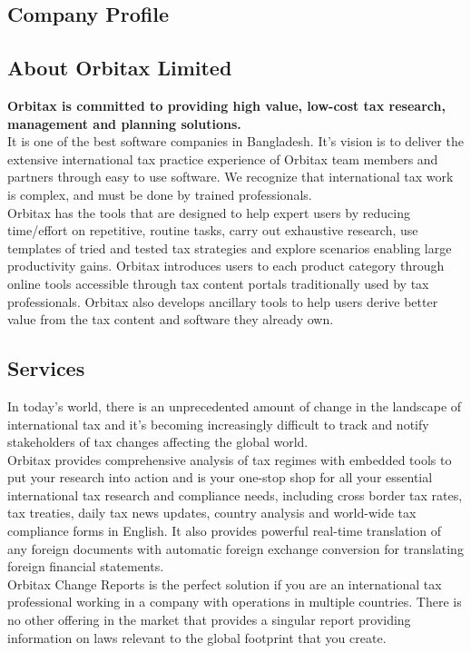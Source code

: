 \begin{flushleft}
\chapter{Company Profile}

\label{ch:results}
\section{About Orbitax Limited}
 \textbf{Orbitax is committed to providing high value, low-cost tax research, management and planning solutions.} \\
It is one of the best software companies in
Bangladesh. It's vision is to deliver the extensive international tax practice experience of Orbitax team members and partners through easy to use software. We recognize that international tax work is complex, and must be done by trained professionals.\\
Orbitax has the tools that are designed to help expert users by reducing time/effort on repetitive, routine tasks, carry out exhaustive research, use templates of tried and tested tax strategies and explore scenarios enabling large productivity gains.
Orbitax introduces users to each product category through online tools accessible through tax content portals traditionally used by tax professionals. Orbitax also develops ancillary tools to help users derive better value from the tax content and software they already own.

\section{Services}
In today’s world, there is an unprecedented amount of change in the landscape of international tax and it’s becoming increasingly difficult to track and notify stakeholders of tax changes affecting the global world.\\
Orbitax provides comprehensive analysis of tax regimes with embedded tools to put your research into action and is your one-stop shop for all your essential international tax research and compliance needs, including cross border tax rates, tax treaties, daily tax news updates, country analysis and world-wide tax compliance forms in English. It also provides powerful real-time translation of any foreign documents with automatic foreign exchange conversion for translating foreign financial statements.\\

Orbitax Change Reports is the perfect solution if you are an international tax professional working in a company with operations in multiple countries. There is no other offering in the market that provides a singular report providing information on laws relevant to the global footprint that you create.


\end{flushleft}
